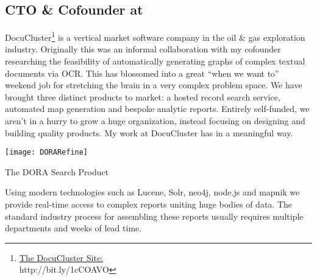 \subsection{\textbf{CTO \& Cofounder} at  \shyears{[2011-PRESENT]}}
DocuCluster\footnote{\href{http://www.docucluster.com/}{The DocuCluster Site:}\\http://bit.ly/1cCOAVO} is a vertical market software company in the oil \& gas exploration industry.  Originally this was an informal collaboration with my cofounder researching the feasibility of automatically generating graphs of complex textual documents via OCR.  This has blossomed into a great ``when we want to'' weekend job for stretching the brain in a very complex problem space.  We have brought three distinct products to market: a hosted record search service, automated map generation and bespoke analytic reports.  Entirely self-funded, we aren't in a hurry to grow a huge organization, instead focusing on designing and building quality products.  My work at DocuCluster has  in a meaningful way.
\begin{marginfigure}%
  \texttt{[image: DORARefine]}
  \caption{The DORA Search Product}
  \label{fig:DoraProduct}
\end{marginfigure}

Using modern technologies such as Lucene, Solr, neo4j, node.js and mapnik we provide real-time access to complex reports uniting huge bodies of data.  The standard industry process for assembling these reports usually requires multiple departments and weeks of lead time.

